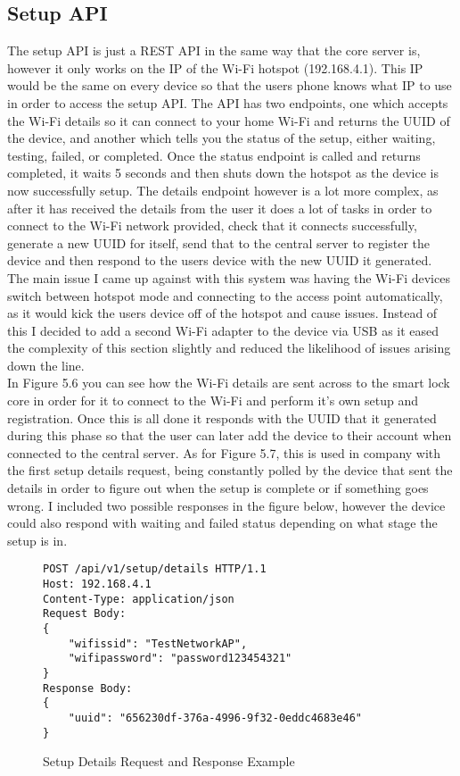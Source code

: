 \subsection{Setup API}
The setup API is just a REST API in the same way that the core server is, however it only works on the IP of the Wi-Fi hotspot (192.168.4.1). This IP would be the same on every device so that the users phone knows what IP to use in order to access the setup API. The API has two endpoints, one which accepts the Wi-Fi details so it can connect to your home Wi-Fi and returns the UUID of the device, and another which tells you the status of the setup, either waiting, testing, failed, or completed. Once the status endpoint is called and returns completed, it waits 5 seconds and then shuts down the hotspot as the device is now successfully setup. The details endpoint however is a lot more complex, as after it has received the details from the user it does a lot of tasks in order to connect to the Wi-Fi network provided, check that it connects successfully, generate a new UUID for itself, send that to the central server to register the device and then respond to the users device with the new UUID it generated. The main issue I came up against with this system was having the Wi-Fi devices switch between hotspot mode and connecting to the access point automatically, as it would kick the users device off of the hotspot and cause issues. Instead of this I decided to add a second Wi-Fi adapter to the device via USB as it eased the complexity of this section slightly and reduced the likelihood of issues arising down the line.
\\
\indent In Figure 5.6 you can see how the Wi-Fi details are sent across to the smart lock core in order for it to connect to the Wi-Fi and perform it's own setup and registration. Once this is all done it responds with the UUID that it generated during this phase so that the user can later add the device to their account when connected to the central server. As for Figure 5.7, this is used in company with the first setup details request, being constantly polled by the device that sent the details in order to figure out when the setup is complete or if something goes wrong. I included two possible responses in the figure below, however the device could also respond with waiting and failed status depending on what stage the setup is in.

\begin{figure}[H]
	\caption{Setup Details Request and Response Example}
	\begin{Verbatim}[frame=single]
POST /api/v1/setup/details HTTP/1.1
Host: 192.168.4.1
Content-Type: application/json
Request Body:
{
	"wifissid": "TestNetworkAP",
	"wifipassword": "password123454321"
}
Response Body:
{
	"uuid": "656230df-376a-4996-9f32-0eddc4683e46"
}
	\end{Verbatim}
\end{figure}

